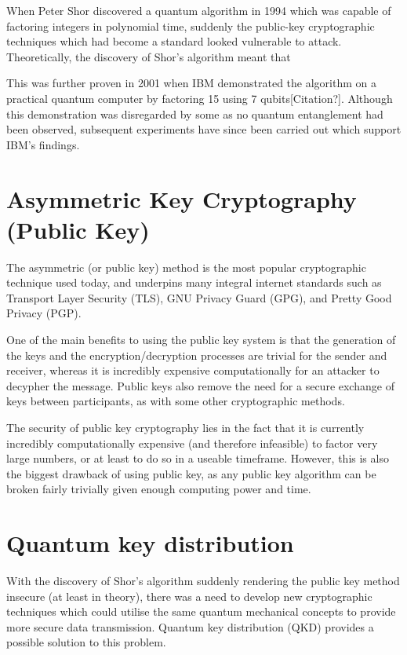 \documentclass[runningheads,a4paper]{llncs}
\begin{document}
When Peter Shor discovered a quantum algorithm in 1994 which was capable of factoring integers in polynomial time\cite{Shor:1994fk}, suddenly the public-key cryptographic techniques which had become a standard looked vulnerable to attack. Theoretically, the discovery of Shor's algorithm meant that 

This was further proven in 2001 when IBM demonstrated the algorithm on a practical quantum computer by factoring 15 using 7 qubits[Citation?]. Although this demonstration was disregarded by some as no quantum entanglement had been observed, subsequent experiments have since been carried out which support IBM's findings\cite{Lu:2007uq}.

\section{Asymmetric Key Cryptography (Public Key)} 

The asymmetric (or public key) method is the most popular cryptographic technique used today, and underpins many integral internet standards such as Transport Layer Security (TLS), GNU Privacy Guard (GPG), and Pretty Good Privacy (PGP).

One of the main benefits to using the public key system is that the generation of the keys and the encryption/decryption processes are trivial for the sender and receiver, whereas it is incredibly expensive computationally for an attacker to decypher the message. Public keys also remove the need for a secure exchange of keys between participants, as with some other cryptographic methods.

The security of public key cryptography lies in the fact that it is currently incredibly computationally expensive (and therefore infeasible) to factor very large numbers, or at least to do so in a useable timeframe. However, this is also the biggest drawback of using public key, as any public key algorithm can be broken fairly trivially given enough computing power and time.

\section{Quantum key distribution}

With the discovery of Shor's algorithm suddenly rendering the public key method insecure (at least in theory), there was a need to develop new cryptographic techniques which could utilise the same quantum mechanical concepts to provide more secure data transmission. Quantum key distribution (QKD) provides a possible solution to this problem.
\end{document}
